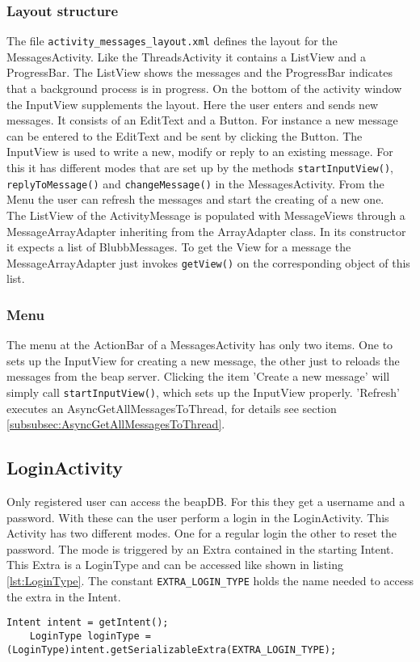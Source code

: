 \documentclass[12pt,a4paper,oneside]{report}
\newcommand{\beapDB}{beapDB}
\newcommand{\beapServer}{beap server}
\newcommand{\code}[1]{\lstinline{#1}}
\begin{document}
\subsubsection{Layout structure}
The file \code{activity_messages_layout.xml} defines the layout for the MessagesActivity. Like the ThreadsActivity it contains a ListView and a ProgressBar. The ListView shows the messages and the ProgressBar indicates that a background process is in progress. On the bottom of the activity window the InputView supplements the layout. Here the user enters and sends new messages. It consists of an EditText and a Button. For instance a new message can be entered to the EditText and be sent by clicking the Button. 
The InputView is used to write a new, modify or reply to an existing message. For this it has different modes that are set up by the methods \code{startInputView()}, \code{ replyToMessage()} and \code{changeMessage()} in the MessagesActivity.
From the Menu the user can refresh the messages and start the creating of a new one. \\

The ListView of the ActivityMessage is populated with MessageViews through a MessageArrayAdapter inheriting from the ArrayAdapter class. 
In its constructor it expects a list of BlubbMessages. To get the View for a message the MessageArrayAdapter just invokes \code{getView()} on the corresponding object of this list. 

\subsubsection{Menu}
The menu at the ActionBar of a MessagesActivity has only two items. One to sets up the InputView for creating a new message, the other just to reloads the messages from the \beapServer{}. Clicking the item 'Create a new message' will simply call \code{startInputView()}, which sets up the InputView properly. 'Refresh' executes an AsyncGetAllMessagesToThread, for details see section  \ref{subsubsec:AsyncGetAllMessagesToThread}.

\subsection{LoginActivity}
Only registered user can access the \beapDB{}. For this they get a username and a password. With these can the user perform a login in the LoginActivity. This Activity has two different modes. One for a regular login the other to reset the password. The mode is triggered by an Extra contained in the starting Intent. This Extra is a LoginType and can be accessed like shown in listing \ref{lst:LoginType}. The constant \code{EXTRA_LOGIN_TYPE} holds the name needed to access the extra in the Intent.
\lstset{language=java}
\begin{lstlisting}[caption=Accessing the LoginType., label=lst:LoginType]
	Intent intent = getIntent();
    LoginType loginType = (LoginType)intent.getSerializableExtra(EXTRA_LOGIN_TYPE);
\end{lstlisting}
\end{document}
